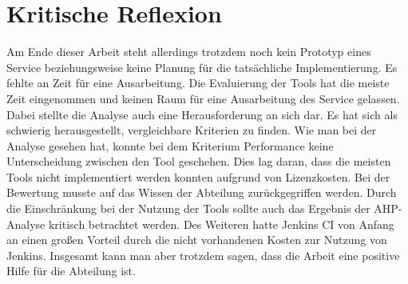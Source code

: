 \section{Kritische Reflexion}
Am Ende dieser Arbeit steht allerdings trotzdem noch kein Prototyp eines Service beziehungsweise keine Planung für die tatsächliche Implementierung. Es fehlte an Zeit für eine Ausarbeitung. Die Evaluierung der Tools hat die meiste Zeit eingenommen und keinen Raum für eine Ausarbeitung des Service gelassen. Dabei stellte die Analyse auch eine Herausforderung an sich dar. Es hat sich als schwierig herausgestellt, vergleichbare Kriterien zu finden. Wie man bei der Analyse gesehen hat, konnte bei dem Kriterium Performance keine Unterscheidung zwischen den Tool geschehen. Dies lag daran, dass die meisten Tools nicht implementiert werden konnten aufgrund von Lizenzkosten. Bei der Bewertung musste auf das Wissen der Abteilung zurückgegriffen werden. Durch die Einschränkung bei der Nutzung der Tools sollte auch das Ergebnis der AHP-Analyse kritisch betrachtet werden. Des Weiteren hatte Jenkins CI von Anfang an einen großen Vorteil durch die nicht vorhandenen Kosten zur Nutzung von Jenkins. Insgesamt kann man aber trotzdem sagen, dass die Arbeit eine positive Hilfe für die Abteilung ist.
\newpage
